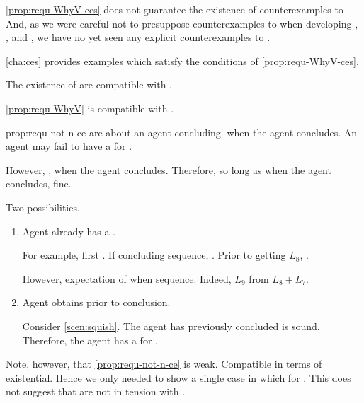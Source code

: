 \begin{note}
  \autoref{prop:requ-WhyV-ces} does not guarantee the existence of counterexamples to \issueConstraint{}.
  And, as we were careful not to presuppose counterexamples to \issueConstraint{} when developing , , and , we have no yet seen any explicit counterexamples to \issueConstraint{}.

  \autoref{cha:ces} provides examples which satisfy the conditions of \autoref{prop:requ-WhyV-ces}.
\end{note}

\begin{note}
  The existence of  are compatible with \issueConstraint{}.

  \begin{observation}%
    \label{prop:requ-not-n-ce}%
    \autoref{prop:requ-WhyV} is compatible with \issueConstraint{}.
  \end{observation}

  \begin{motivation}{prop:requ-not-n-ce}
     are about an agent concluding.
    \fc{} when the agent concludes.
    An agent may fail to have a \wit{} for \fc{}.

    However, \issueConstraint{}, \wit{} when the agent concludes.
    Therefore, so long as \wit{} when the agent concludes, fine.

    Two possibilities.
    \begin{enumerate}
    \item
      Agent already has a \wit{}.

      For example, first .
      If concluding sequence, \fc{}.
      Prior to getting \(L_{8}\), \fc{}.

      However, expectation of \wit{} when sequence.
      Indeed, \(L_{9}\) from \(L_{8} + L_{7}\).
    \item
      Agent obtains \wit{} prior to conclusion.

      Consider \autoref{scen:squish}.
      The agent has previously concluded \sqE{} is sound.
      Therefore, the agent has a \wit{} for \ros{}.
    \end{enumerate}
    \vspace{-\baselineskip}
  \end{motivation}

  Note, however, that \autoref{prop:requ-not-n-ce} is weak.
  Compatible in terms of existential.
  Hence we only needed to show a single case in which \wit{} for \requ{}.
  This does not suggest that  are not in tension with \issueConstraint{}.
\end{note}

